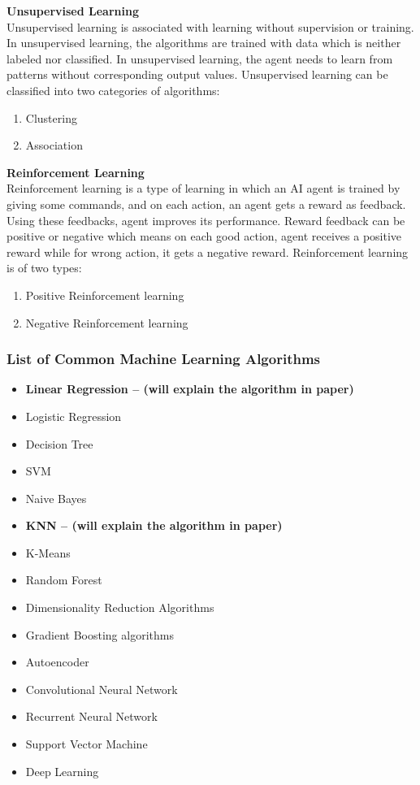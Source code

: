 \textbf{Unsupervised Learning} \\ 
Unsupervised learning is associated with learning without supervision or 
training. In unsupervised learning, the algorithms are trained with data
which is neither labeled nor classified. In unsupervised learning,
the agent needs to learn from patterns without corresponding output values.
Unsupervised learning can be classified into two categories of algorithms:

\begin{enumerate}
\item Clustering
\item Association
\end{enumerate}


\textbf{Reinforcement Learning} \\ 
Reinforcement learning is a type of learning in which an AI agent is trained by giving some commands, and on each action, an agent gets a reward as feedback. Using these feedbacks, agent improves its performance. Reward feedback can be positive or negative which means on each good action, agent receives a positive reward while for wrong action, it gets a negative reward.
Reinforcement learning is of two types:
\begin{enumerate}
\item Positive Reinforcement learning
\item Negative Reinforcement learning
\end{enumerate}


\subsubsection{List of Common Machine Learning Algorithms}
\begin{itemize}
\item \textbf{Linear Regression – (will explain the algorithm in paper)}
\item Logistic Regression
\item Decision Tree
\item SVM
\item Naive Bayes
\item \textbf{KNN – (will explain the algorithm in paper)}
\item K-Means
\item Random Forest
\item Dimensionality Reduction Algorithms
\item Gradient Boosting algorithms
\item Autoencoder
\item Convolutional Neural Network
\item Recurrent Neural Network
\item Support Vector Machine
\item Deep Learning
\end{itemize}

